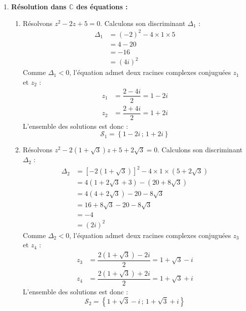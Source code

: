 \documentclass[12pt,a4paper]{article}
\begin{document}
\begin{enumerate}
    \item \textbf{Résolution dans $\mathbb{C}$ des équations :}
    \begin{enumerate}
        \item Résolvons $z^2 - 2z + 5 = 0$. Calculons son discriminant $\Delta_1$ :
        $$
        \begin{aligned}
            \Delta_1 &= (-2)^2 - 4 \times 1 \times 5 \\
            &= 4 - 20 \\
            &= -16 \\
            &= (4i)^2
        \end{aligned}
        $$
        Comme $\Delta_1 < 0$, l'équation admet deux racines complexes conjuguées $z_1$ et $z_2$ :
        $$
        \begin{aligned}
            z_1 &= \dfrac{2 - 4i}{2} = 1 - 2i \\
            z_2 &= \dfrac{2 + 4i}{2} = 1 + 2i
        \end{aligned}
        $$
        L'ensemble des solutions est donc :
        $$
        \mathcal{S}_1 = \left\{ 1 - 2i \,;\, 1 + 2i \right\}
        $$

        \item Résolvons $z^2 - 2(1 + \sqrt{3})z + 5 + 2\sqrt{3} = 0$. Calculons son discriminant $\Delta_2$ :
        $$
        \begin{aligned}
            \Delta_2 &= \left[-2(1 + \sqrt{3})\right]^2 - 4 \times 1 \times (5 + 2\sqrt{3}) \\
            &= 4(1 + 2\sqrt{3} + 3) - (20 + 8\sqrt{3}) \\
            &= 4(4 + 2\sqrt{3}) - 20 - 8\sqrt{3} \\
            &= 16 + 8\sqrt{3} - 20 - 8\sqrt{3} \\
            &= -4 \\
            &= (2i)^2
        \end{aligned}
        $$
        Comme $\Delta_2 < 0$, l'équation admet deux racines complexes conjuguées $z_3$ et $z_4$ :
        $$
        \begin{aligned}
            z_3 &= \dfrac{2(1 + \sqrt{3}) - 2i}{2} = 1 + \sqrt{3} - i \\
            z_4 &= \dfrac{2(1 + \sqrt{3}) + 2i}{2} = 1 + \sqrt{3} + i
        \end{aligned}
        $$
        L'ensemble des solutions est donc :
        $$
        \mathcal{S}_2 = \left\{ 1 + \sqrt{3} - i \,;\, 1 + \sqrt{3} + i \right\}
        $$
    \end{enumerate}


\end{enumerate}
\end{document}
